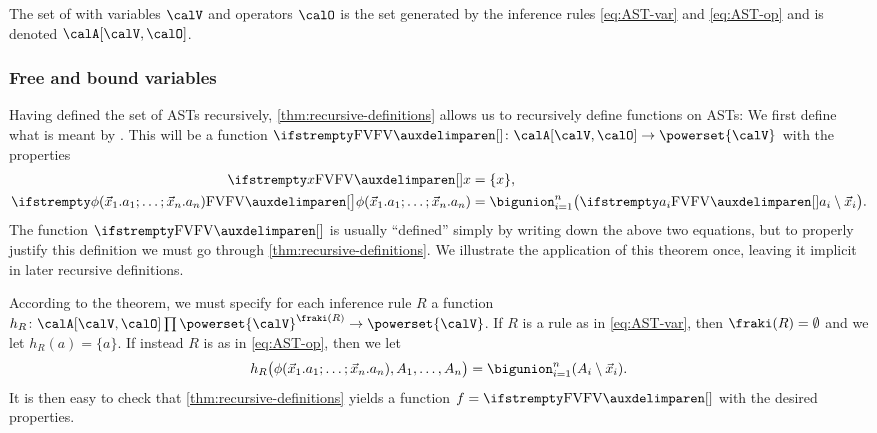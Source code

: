 \begin{definition}
    The set of  with variables $\setVarAST$ and operators $\setOp$ is the set generated by the inference rules \cref{eq:AST-var} and \cref{eq:AST-op} and is denoted $\setAST{\setVarAST}{\setOp}$.
\end{definition}


\subsubsection{Free and bound variables}

Having defined the set of ASTs recursively, \cref{thm:recursive-definitions} allows us to recursively define functions on ASTs: We first define what is meant by . This will be a function $\freevar{} \colon \setAST{\setVarAST}{\setOp} \to \powerset{\setVarAST}$ with the properties
%
\begin{align*}
    \freevar{x}
        &= \{x\}, \\
    \freevar[\big]{\phi(\seq{x}_1.a_1 ; \ldots ; \seq{x}_n.a_n)}
        &= \bigunion_{i=1}^n \bigl( \freevar{a_i} \setminus \seq{x}_i \bigr).
\end{align*}
%
The function $\freevar{}$ is usually \enquote{defined} simply by writing down the above two equations, but to properly justify this definition we must go through \cref{thm:recursive-definitions}. We illustrate the application of this theorem once, leaving it implicit in later recursive definitions.

According to the theorem, we must specify for each inference rule $R$ a function $h_R \colon \setAST{\setVarAST}{\setOp} \prod \powerset{\setVarAST}^{\idxset{R}} \to \powerset{\setVarAST}$. If $R$ is a rule as in \cref{eq:AST-var}, then $\idxset{R} = \emptyset$ and we let $h_R(a) = \{a\}$. If instead $R$ is as in \cref{eq:AST-op}, then we let
%
\begin{equation*}
    h_R \bigl( \phi(\seq{x}_1.a_1 ; \ldots ; \seq{x}_n.a_n), A_1, \ldots, A_n \bigr)
        = \bigunion_{i=1}^n (A_i \setminus \seq{x}_i).
\end{equation*}
%
It is then easy to check that \cref{thm:recursive-definitions} yields a function $f = \freevar{}$ with the desired properties.


